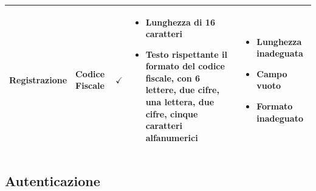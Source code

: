 \documentclass[12pt]{article}
\begin{document}
\begin{longtable}{|l|l|l|l|l|}
 \textbf{Registrazione} & Codice Fiscale & $\checkmark$ & \begin{minipage}{3.5cm}
 \vspace{5pt}
 \begin{itemize}
 \item Lunghezza di 16 caratteri
 \item Testo rispettante il formato del codice fiscale, con 6 lettere, due cifre, una lettera, due cifre, cinque caratteri alfanumerici
 \end{itemize}
 \vspace{5pt}
 \end{minipage} & \begin{minipage}{4cm}
 \vspace{5pt}
 \begin{itemize}
 \item Lunghezza inadeguata
 \item Campo vuoto
 \item Formato inadeguato
 \end{itemize}
 \vspace{5pt}
 \end{minipage} \\ \hline
 
 \end{longtable}
 \newpage
 
 \subsection{Autenticazione}
 
\end{document}
